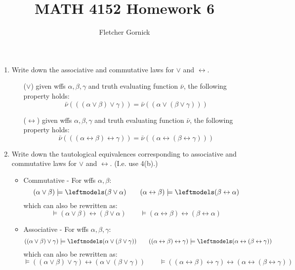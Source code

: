 \documentclass[11pt]{article}
\newcommand{\n}{\vspace{0.5cm}}
\begin{document}
\title{\vspace{-1.5cm}MATH 4152 Homework 6}
  \author{Fletcher Gornick}
  \maketitle
  \begin{enumerate}
    \item Write down the associative and commutative laws for \(\vee\) and \(\leftrightarrow\).
      \begin{enumerate}
        \item[(\(\vee\))] given wffs \(\alpha, \beta, \gamma\) and truth evaluating function \(\bar\nu\), the following property holds:
          \[\bar\nu(((\alpha \vee \beta) \vee \gamma)) = \bar\nu((\alpha \vee (\beta \vee \gamma))) \]

        \item[(\(\leftrightarrow\))] given wffs \(\alpha, \beta, \gamma\) and truth evaluating function \(\bar\nu\), the following property holds:
          \[\bar\nu(((\alpha \leftrightarrow \beta) \leftrightarrow \gamma)) = \bar\nu((\alpha \leftrightarrow (\beta \leftrightarrow \gamma))) \]
      \end{enumerate} \n

    \item Write down the tautological equivalences corresponding to associative and commutative laws for \(\vee\) and \(\leftrightarrow\). (I.e. use 4(b).)
      \begin{itemize}
        \item Commutative - For wffs \(\alpha, \beta\):
          \[(\alpha \vee \beta) \models \leftmodels (\beta \vee \alpha) \quad\quad (\alpha \leftrightarrow \beta) \models \leftmodels (\beta \leftrightarrow \alpha)\]
          which can also be rewritten as:
          \[\models (\alpha \vee \beta) \leftrightarrow (\beta \vee \alpha) \quad \quad \models (\alpha \leftrightarrow \beta) \leftrightarrow (\beta \leftrightarrow \alpha)\]
        \item Associative - For wffs \(\alpha, \beta, \gamma\):
          \[((\alpha \vee \beta) \vee \gamma) \models \leftmodels (\alpha \vee (\beta \vee \gamma)) \quad\quad ((\alpha \leftrightarrow \beta) \leftrightarrow \gamma) \models \leftmodels (\alpha \leftrightarrow (\beta \leftrightarrow \gamma))\]
          which can also be rewritten as:
          \[\models ((\alpha \vee \beta) \vee \gamma) \leftrightarrow (\alpha \vee (\beta \vee \gamma)) \quad \quad \models ((\alpha \leftrightarrow \beta) \leftrightarrow \gamma) \leftrightarrow (\alpha \leftrightarrow (\beta \leftrightarrow \gamma))\]
      \end{itemize} \n


\end{enumerate}
\end{document}
